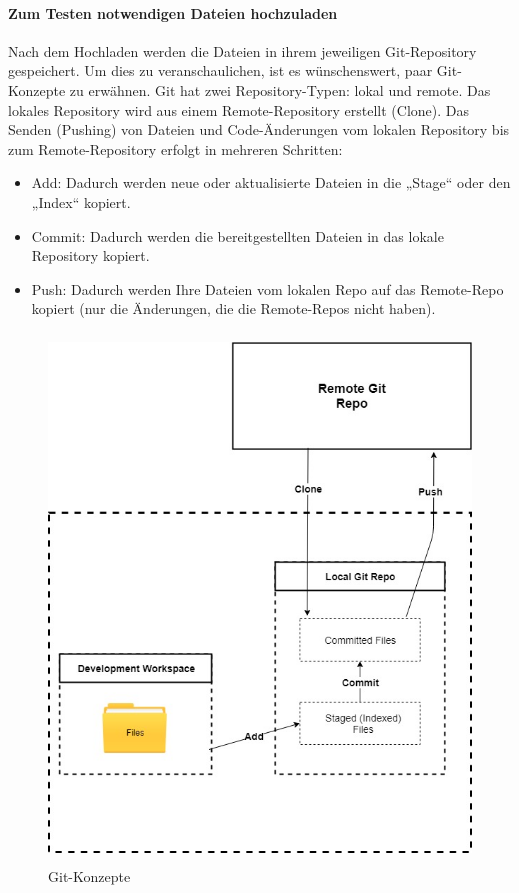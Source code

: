 \documentclass[apaper4,12p]{scrartcl}
\begin{document}
\paragraph{Zum Testen notwendigen Dateien hochzuladen}
Nach dem Hochladen werden die Dateien in ihrem jeweiligen Git-Repository gespeichert. Um dies zu veranschaulichen, ist es wünschenswert, paar Git-Konzepte zu erwähnen.
\newline
Git hat zwei Repository-Typen: lokal und remote. Das lokales Repository wird aus einem Remote-Repository erstellt (Clone). Das Senden (Pushing) von Dateien und Code-Änderungen vom lokalen Repository bis zum Remote-Repository erfolgt in mehreren Schritten: 
\begin{itemize}
	\item Add: Dadurch werden neue oder aktualisierte Dateien in die „Stage“ oder den „Index“ kopiert.
	\item Commit: Dadurch werden die bereitgestellten Dateien in das lokale Repository kopiert.
	\item Push: Dadurch werden Ihre Dateien vom lokalen Repo auf das Remote-Repo kopiert (nur die Änderungen, die die Remote-Repos nicht haben).
\end{itemize}
\begin{figure}[h!]
	\begin{center}
		\includegraphics[width=14cm, height=14cm]{Git-Konzept.jpg}
		\caption{Git-Konzepte} 
		\label{ Git-Konzepte} 
	\end{center}
\end{figure}
\end{document}
